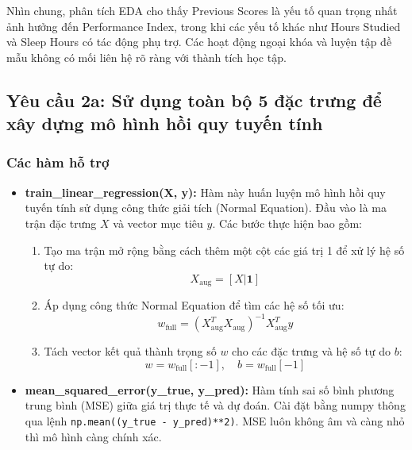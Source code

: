 Nhìn chung, phân tích EDA cho thấy Previous Scores là yếu tố quan trọng nhất ảnh hưởng đến Performance Index, trong khi các yếu tố khác như Hours Studied và Sleep Hours có tác động phụ trợ. Các hoạt động ngoại khóa và luyện tập đề mẫu không có mối liên hệ rõ ràng với thành tích học tập.

\subsection{Yêu cầu 2a: Sử dụng toàn bộ 5 đặc trưng để xây dựng mô hình hồi quy tuyến tính}
\subsubsection{Các hàm hỗ trợ}

\begin{itemize}
	\item \textbf{train\_linear\_regression(X, y):} Hàm này huấn luyện mô hình hồi quy tuyến tính sử dụng công thức giải tích (Normal Equation). Đầu vào là ma trận đặc trưng \( X \) và vector mục tiêu \( y \). Các bước thực hiện bao gồm:
	      \begin{enumerate}
		      \item Tạo ma trận mở rộng bằng cách thêm một cột các giá trị 1 để xử lý hệ số tự do:
		            \begin{equation}
			            X_{\text{aug}} = [X | \mathbf{1}]
		            \end{equation}

		      \item Áp dụng công thức Normal Equation để tìm các hệ số tối ưu:
		            \begin{equation}
			            w_{\text{full}} = (X_{\text{aug}}^T X_{\text{aug}})^{-1} X_{\text{aug}}^T y
		            \end{equation}

		      \item Tách vector kết quả thành trọng số \( w \) cho các đặc trưng và hệ số tự do \( b \):
		            \begin{equation}
			            w = w_{\text{full}}[:-1], \quad b = w_{\text{full}}[-1]
		            \end{equation}
	      \end{enumerate}

	\item \textbf{mean\_squared\_error(y\_true, y\_pred):} Hàm tính sai số bình phương trung bình (MSE) giữa giá trị thực tế và dự đoán. Cài đặt bằng numpy thông qua lệnh \texttt{np.mean((y\_true - y\_pred)**2)}. MSE luôn không âm và càng nhỏ thì mô hình càng chính xác.

\end{itemize}

